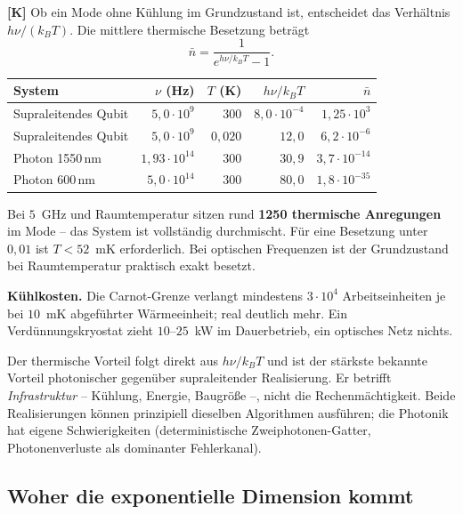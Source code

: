\textbf{[K]} Ob ein Mode ohne Kühlung im Grundzustand ist, entscheidet das
Verhältnis $h\nu/(k_B T)$. Die mittlere thermische Besetzung beträgt
\begin{equation}
  \bar n = \frac{1}{e^{h\nu/k_B T} - 1}.
\end{equation}

\begin{center}
\begin{tabular}{lrrrr}
\toprule
System & $\nu$ (Hz) & $T$ (K) & $h\nu/k_BT$ & $\bar n$ \\
\midrule
Supraleitendes Qubit & $5{,}0\cdot10^{9}$ & $300$ & $8{,}0\cdot10^{-4}$
  & $1{,}25\cdot10^{3}$ \\
Supraleitendes Qubit & $5{,}0\cdot10^{9}$ & $0{,}020$ & $12{,}0$
  & $6{,}2\cdot10^{-6}$ \\
Photon 1550\,nm & $1{,}93\cdot10^{14}$ & $300$ & $30{,}9$
  & $3{,}7\cdot10^{-14}$ \\
Photon 600\,nm & $5{,}0\cdot10^{14}$ & $300$ & $80{,}0$
  & $1{,}8\cdot10^{-35}$ \\
\bottomrule
\end{tabular}
\end{center}

Bei $5$~GHz und Raumtemperatur sitzen rund \textbf{1250 thermische
Anregungen} im Mode -- das System ist vollständig durchmischt. Für eine
Besetzung unter $0{,}01$ ist $T < 52$~mK erforderlich. Bei optischen
Frequenzen ist der Grundzustand bei Raumtemperatur praktisch exakt besetzt.

\textbf{Kühlkosten.} Die Carnot-Grenze verlangt mindestens $3\cdot10^{4}$
Arbeitseinheiten je bei $10$~mK abgeführter Wärmeeinheit; real deutlich mehr.
Ein Verdünnungskryostat zieht $10$--$25$~kW im Dauerbetrieb, ein optisches
Netz nichts.

\begin{keyresult}
Der thermische Vorteil folgt direkt aus $h\nu/k_BT$ und ist der stärkste
bekannte Vorteil photonischer gegenüber supraleitender Realisierung. Er
betrifft \emph{Infrastruktur} -- Kühlung, Energie, Baugröße --, nicht die
Rechenmächtigkeit. Beide Realisierungen können prinzipiell dieselben
Algorithmen ausführen; die Photonik hat eigene Schwierigkeiten
(deterministische Zweiphotonen-Gatter, Photonenverluste als dominanter
Fehlerkanal).
\end{keyresult}

\subsection{Woher die exponentielle Dimension kommt}

